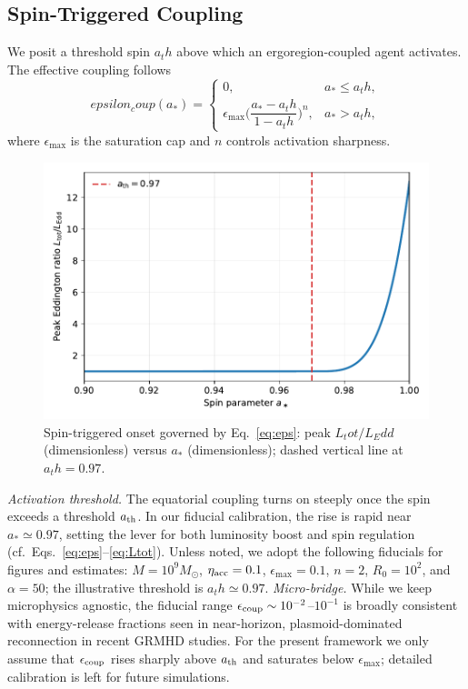 \documentclass[twocolumn]{aastex701}
\newcommand{\ath}{a_{\rm th}}
\newcommand{\rg}{r_g}
\newcommand{\LEdd}{L_{\rm Edd}}
\newcommand{\Ltot}{L_{\rm tot}}
\newcommand{\FeKa}{\mathrm{Fe\,K}\alpha}
\newcommand{\epscoup}{\epsilon_{\rm coup}}
\newcommand{\aeq}{a_{\rm eq}}
\def\ath{a_th}\def\rg{r_g}\def\LEdd{L_Edd}\def\Ltot{L_tot}\def\FeKa{Fe K\string\alpha}%
\def\epscoup{epsilon_coup}\def\aeq{a_eq}\def\mathrm#1{#1}%
\begin{document}
\subsection{Spin-Triggered Coupling}\label{sec:coupling}
We posit a threshold spin $\ath$ above which an ergoregion-coupled agent activates. The effective coupling follows
\begin{equation}
\epscoup(a_\ast)=
\begin{cases}
0, & a_\ast\le \ath,\\[3pt]
\epsilon_{\max}\Big(\dfrac{a_\ast-\ath}{1-\ath}\Big)^{n}, & a_\ast>\ath,
\end{cases}
\label{eq:eps}
\end{equation}
where $\epsilon_{\max}$ is the saturation cap and $n$ controls activation sharpness.
\begin{figure}[!htbp]
  \centering
  \includegraphics[width=.92\linewidth]{Fig_Onset.pdf}
  \caption{Spin-triggered onset governed by Eq.~\eqref{eq:eps}: peak $\Ltot/\LEdd$ (dimensionless) versus $a_\ast$ (dimensionless); dashed vertical line at $\ath=0.97$.}
  \label{fig:onset}
\end{figure}
\noindent\textit{Activation threshold.}
The equatorial coupling turns on steeply once the spin exceeds a threshold \(a_{\rm th}\).
In our fiducial calibration, the rise is rapid near \(a_\ast \simeq 0.97\), setting the lever for both luminosity boost and spin regulation (cf.\ Eqs.~\eqref{eq:eps}--\eqref{eq:Ltot}).
\FloatBarrier
Unless noted, we adopt the following fiducials for figures and estimates: $M=10^9M_\odot$, $\eta_{\rm acc}=0.1$, $\epsilon_{\max}=0.1$, $n=2$, $R_0=10^2$, and $\alpha=50$; the illustrative threshold is $\ath\simeq0.97$.
\noindent\emph{Micro-bridge.}
While we keep microphysics agnostic, the fiducial range
$\epsilon_{\rm coup}\sim10^{-2}$–$10^{-1}$ is broadly consistent with
energy-release fractions seen in near-horizon, plasmoid-dominated
reconnection in recent GRMHD studies. For the present framework we only
assume that $\epsilon_{\rm coup}$ rises sharply above $a_{\rm th}$ and
saturates below $\epsilon_{\max}$; detailed calibration is left for
future simulations.
\end{document}

